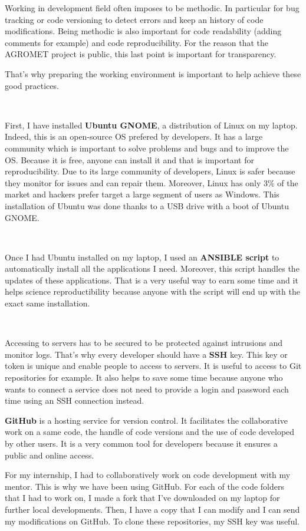 \documentclass[12pt,twoside]{reedthesis}
\theoremstyle{definition}
\theoremstyle{definition}
\theoremstyle{definition}
\theoremstyle{remark}
\begin{document}
Working in development field often imposes to be methodic. In particular
for bug tracking or code versioning to detect errors and keep an history
of code modifications. Being methodic is also important for code
readability (adding comments for example) and code reproducibility. For
the reason that the AGROMET project is public, this last point is
important for transparency.

That's why preparing the working environment is important to help
achieve these good practices.

~

First, I have installed \textbf{Ubuntu GNOME}, a distribution of Linux
on my laptop. Indeed, this is an open-source OS prefered by developers.
It has a large community which is important to solve problems and bugs
and to improve the OS. Because it is free, anyone can install it and
that is important for reproducibility. Due to its large community of
developers, Linux is safer because they monitor for issues and can
repair them. Moreover, Linux has only 3\% of the market and hackers
prefer target a large segment of users as Windows. This installation of
Ubuntu was done thanks to a USB drive with a boot of Ubuntu GNOME.

~

Once I had Ubuntu installed on my laptop, I used an \textbf{ANSIBLE
script} to automatically install all the applications I need. Moreover,
this script handles the updates of these applications. That is a very
useful way to earn some time and it helps science reproductibility
because anyone with the script will end up with the exact same
installation.

~

Accessing to servers has to be secured to be protected against
intrusions and monitor logs. That's why every developer should have a
\textbf{SSH} key. This key or token is unique and enable people to
access to servers. It is useful to access to Git repositories for
example. It also helps to save some time because anyone who wants to
connect a service does not need to provide a login and password each
time using an SSH connection instead.

\textbf{GitHub} is a hosting service for version control. It facilitates
the collaborative work on a same code, the handle of code versions and
the use of code developed by other users. It is a very common tool for
developers because it ensures a public and online access.

For my internship, I had to collaboratively work on code development
with my mentor. This is why we have been using GitHub. For each of the
code folders that I had to work on, I made a fork that I've downloaded
on my laptop for further local developments. Then, I have a copy that I
can modify and I can send my modifications on GitHub. To clone these
repositories, my SSH key was useful.
\end{document}

